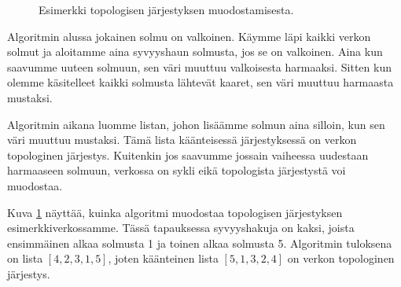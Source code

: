 \begin{figure}
\begin{center}
\end{center}
\caption{Esimerkki topologisen järjestyksen muodostamisesta.}
\label{fig:topesi}
\end{figure}

Algoritmin alussa jokainen solmu on valkoinen.
Käymme läpi kaikki verkon solmut ja aloitamme aina syvyyshaun
solmusta, jos se on valkoinen.
Aina kun saavumme uuteen solmuun, sen väri muuttuu
valkoisesta harmaaksi.
Sitten kun olemme käsitelleet kaikki solmusta lähtevät
kaaret, sen väri muuttuu harmaasta mustaksi.

Algoritmin aikana luomme listan, johon lisäämme solmun
aina silloin, kun sen väri muuttuu mustaksi.
Tämä lista käänteisessä järjestyksessä on verkon
topologinen järjestys.
Kuitenkin jos saavumme jossain vaiheessa uudestaan harmaaseen solmuun,
verkossa on sykli eikä topologista järjestystä voi muodostaa.

Kuva \ref{fig:topesi} näyttää, kuinka algoritmi muodostaa topologisen
järjestyksen esimerkkiverkossamme.
Tässä tapauksessa syvyyshakuja on kaksi,
joista ensimmäinen alkaa solmusta 1 ja toinen alkaa solmusta 5.
Algoritmin tuloksena on lista $[4,2,3,1,5]$,
joten käänteinen lista $[5,1,3,2,4]$ on verkon topologinen järjestys.

